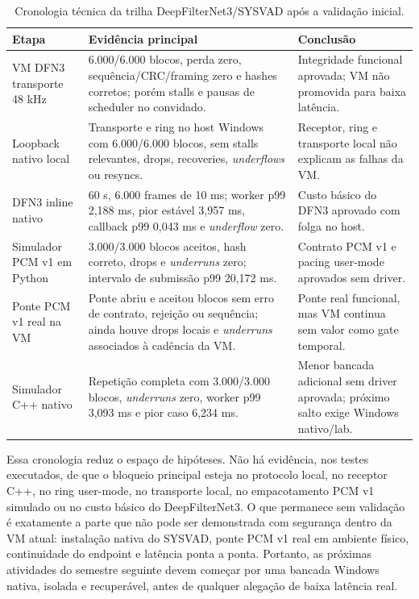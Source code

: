 \begin{table}[!htbp]
\centering
\caption{Cronologia técnica da trilha DeepFilterNet3/SYSVAD após a validação inicial.}
\label{tab:dfn3-cronologia}
\footnotesize
{}
\begin{tabularx}{\textwidth}{>{\raggedright\arraybackslash}p{2.3cm}X>{\raggedright\arraybackslash}p{3.1cm}}
\toprule
\textbf{Etapa} & \textbf{Evidência principal} & \textbf{Conclusão} \\
\midrule
VM DFN3 transporte 48 kHz & 6.000/6.000 blocos, perda zero, sequência/CRC/framing zero e hashes corretos; porém stalls e pausas de scheduler no convidado. & Integridade funcional aprovada; VM não promovida para baixa latência. \\
\addlinespace
Loopback nativo local & Transporte e ring no host Windows com 6.000/6.000 blocos, sem stalls relevantes, drops, recoveries, \textit{underflows} ou resyncs. & Receptor, ring e transporte local não explicam as falhas da VM. \\
\addlinespace
DFN3 inline nativo & 60 s, 6.000 frames de 10 ms; worker p99 2,188 ms, pior estável 3,957 ms, callback p99 0,043 ms e \textit{underflow} zero. & Custo básico do DFN3 aprovado com folga no host. \\
\addlinespace
Simulador PCM v1 em Python & 3.000/3.000 blocos aceitos, hash correto, drops e \textit{underruns} zero; intervalo de submissão p99 20,172 ms. & Contrato PCM v1 e pacing user-mode aprovados sem driver. \\
\addlinespace
Ponte PCM v1 real na VM & Ponte abriu e aceitou blocos sem erro de contrato, rejeição ou sequência; ainda houve drops locais e \textit{underruns} associados à cadência da VM. & Ponte real funcional, mas VM continua sem valor como gate temporal. \\
\addlinespace
Simulador C++ nativo & Repetição completa com 3.000/3.000 blocos, \textit{underruns} zero, worker p99 3,093 ms e pior caso 6,234 ms. & Menor bancada adicional sem driver aprovada; próximo salto exige Windows nativo/lab. \\
\bottomrule
\end{tabularx}
\end{table}
\FloatBarrier

Essa cronologia reduz o espaço de hipóteses. Não há evidência, nos testes executados, de que o bloqueio principal esteja no protocolo local, no receptor C++, no ring user-mode, no transporte local, no empacotamento PCM v1 simulado ou no custo básico do DeepFilterNet3. O que permanece sem validação é exatamente a parte que não pode ser demonstrada com segurança dentro da VM atual: instalação nativa do SYSVAD, ponte PCM v1 real em ambiente físico, continuidade do endpoint e latência ponta a ponta. Portanto, as próximas atividades do semestre seguinte devem começar por uma bancada Windows nativa, isolada e recuperável, antes de qualquer alegação de baixa latência real.

